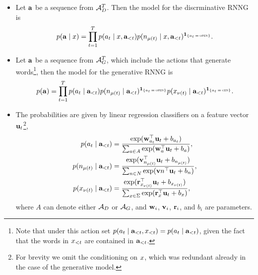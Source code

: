 \begin{itemize}
  \item Let $\mathbf{a}$ be a sequence from $\mathcal{A}_D^T$. Then the model for the discrminative RNNG is
  \begin{align}
    \label{eq:disc-model}
    p(\mathbf{a} \mid x) = \prod_{t=1}^T p(a_t \mid x, \mathbf{a}_{<t}) p(n_{\mu(t)} \mid x, \mathbf{a}_{<t} )^{ \operatorname{\mathbf{1}}_{ \{ a_t \, = \, \textsc{open} \} } }.
  \end{align}
  \item Let $\mathbf{a}$ be a sequence from $\mathcal{A}_G^T$, which include the actions that generate words\footnote{Note that under this action set $p(a_t \mid \mathbf{a}_{<t}, x_{<t}) = p(a_t \mid \mathbf{a}_{<t})$, given the fact that the words in $x_{<t}$ are contained in $\mathbf{a}_{<t}$.}, then the model for the generative RNNG is
  \begin{align}
    \label{eq:gen-model}
    p(\mathbf{a}) = \prod_{t=1}^T p(a_t \mid \mathbf{a}_{<t}) p(n_{\mu(t)} \mid   \mathbf{a}_{<t})^{ \operatorname{\mathbf{1}}_{ \{ a_t \, = \, \textsc{open} \} } } p(x_{\nu(t)} \mid \mathbf{a}_{<t})^{ \operatorname{\mathbf{1}}_{ \{ a_t \, = \, \textsc{gen} \} } }.
  \end{align}

  \item The probabilities are given by linear regression classifiers on a feature vector $\mathbf{u}_t$\footnote{For brevity we omit the conditioning on $x$, which was redundant already in the case of the generative model.},
  \begin{align}
    \label{eq:action-regression}
    p(a_t \mid \mathbf{a}_{<t})
      &= \frac{ \exp ( \mathbf{w}_{a_t}^{\top} \mathbf{u}_t + b_{a_t} ) }{ \sum_{a \in A} \exp ( \mathbf{w}_{a}^{\top} \mathbf{u}_t + b_{a} ) },  \\
    p(n_{\mu(t)} \mid \mathbf{a}_{<t})
      &= \frac{ \exp ( \mathbf{v}_{n_{\mu(t)}}^{\top} \mathbf{u}_t + b_{n_{\mu(t)}} ) }{ \sum_{n \in N} \exp ( \mathbf{v} {n}^{\top} \mathbf{u}_t + b_{n} ) }, \\
    p(x_{\nu(t)} \mid \mathbf{a}_{<t})
      &= \frac{ \exp ( \mathbf{r}_{x_{\nu(t)}}^{\top} \mathbf{u}_t + b_{x_{\nu(t)}} ) }{ \sum_{x \in \Sigma} \exp ( \mathbf{r}_{x}^{\top} \mathbf{u}_t + b_{x} ) },  \\
  \end{align}
  where $A$ can denote either $\mathcal{A}_D$ or $\mathcal{A}_G$, and $\mathbf{w}_i$, $\mathbf{v}_i$, $\mathbf{r}_i$, and $b_i$ are parameters.


\end{itemize}
